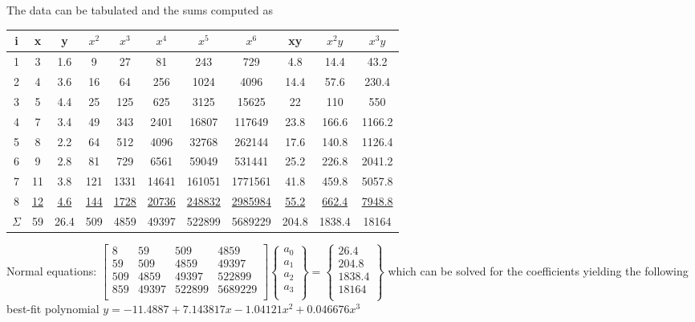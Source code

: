 \documentclass[../main.tex]{subfiles}
\begin{document}
\section{}
The data can be tabulated and the sums computed as
	\bigbreak
	\begin{tabular}{ccccccccccc}
	\Xhline{1.5pt}i&x&y&$x^2$&$x^3$&$x^4$&$x^5$&$x^6$&xy&$x^2y$&$x^3y$\\
	\hline 1&3&1.6&9&27&81&243&729&4.8&14.4&43.2\\
		2&4&3.6&16&64&256&1024&4096&14.4&57.6&230.4\\
		3&5&4.4&25&125&625&3125&15625&22&110&550\\
		4&7&3.4&49&343&2401&16807&117649&23.8&166.6&1166.2\\
		5&8&2.2&64&512&4096&32768&262144&17.6&140.8&1126.4\\
		6&9&2.8&81&729&6561&59049&531441&25.2&226.8&2041.2\\
		7&11&3.8&121&1331&14641&161051&1771561&41.8&459.8&5057.8\\
		8&\underline{12}&\underline{4.6}&\underline{144}&\underline{1728}&\underline{20736}&\underline{248832}&\underline{2985984}&\underline{55.2}&\underline{662.4}&\underline{7948.8}\\
		$\Sigma$&59&26.4&509&4859&49397&522899&5689229&204.8&1838.4&18164\\
	\end{tabular}
	\bigbreak
Normal equations: 
	\bigbreak
	$\begin{bmatrix}
		8&59&509&4859\\
		59&509&4859&49397\\
		509&4859&49397&522899\\
		859&49397&522899&5689229\\
	\end{bmatrix}
	\begin{Bmatrix}
		a_0\\
		a_1\\
		a_2\\
		a_3\\
	\end{Bmatrix}
	=
	\begin{Bmatrix}
	26.4\\
	204.8\\
	1838.4\\
	18164\\
	\end{Bmatrix}$
	\bigbreak
which can be solved for the coefficients yielding the following best-fit polynomial
	\bigbreak
$y = -11.4887 + 7.143817x -1.04121x^2+ 0.046676x^3$
\end{document}
